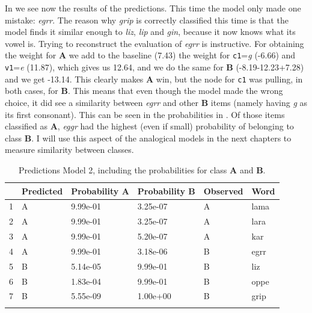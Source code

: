 In  we see now the results of the predictions. This time the model only made one mistake: \textit{egrr}. The reason why \textit{grip} is correctly classified this time is that the model finds it similar enough to \textit{liz}, \textit{lip} and \textit{gin}, because it now knows what its vowel is. Trying to reconstruct the evaluation of \textit{egrr} is instructive. For obtaining the weight for \textbf{A} we add to the baseline (7.43) the weight for \texttt{c1}=\textit{g} (-6.66) and \texttt{v1}=\textit{e} (11.87), which gives us 12.64, and we do the same for \textbf{B} (-8.19-12.23+7.28) and we get -13.14. This clearly makes \textbf{A} win, but the node for \texttt{c1} was pulling, in both cases, for \textbf{B}. This means that even though the model made the wrong choice, it did see a similarity between \textit{egrr} and other \textbf{B} items (namely having \textit{g} as its first consonant). This can be seen in the probabilities in . Of those items classified as \textbf{A}, \textit{eggr} had the highest (even if small) probability of belonging to class \textbf{B}. I will use this aspect of the analogical models in the next chapters to measure similarity between classes.

\begin{table}[!htpb]
  \centering
  \begin{tabular}{llllll}
    \lsptoprule
      & Predicted & Probability A & Probability B & Observed & Word \\
    \midrule
    1 & A         & 9.99e-01      & 3.25e-07      & A        & lama \\
    2 & A         & 9.99e-01      & 3.25e-07      & A        & lara \\
    3 & A         & 9.99e-01      & 5.20e-07      & A        & kar  \\
    4 & A         & 9.99e-01      & 3.18e-06      & B        & egrr \\
    5 & B         & 5.14e-05      & 9.99e-01      & B        & liz  \\
    6 & B         & 1.83e-04      & 9.99e-01      & B        & oppe \\
    7 & B         & 5.55e-09      & 1.00e+00      & B        & grip \\
    \lspbottomrule
  \end{tabular}
  \caption{Predictions Model 2, including the probabilities for class \textbf{A} and \textbf{B}.}\label{tab:preds-model2}
\end{table}

